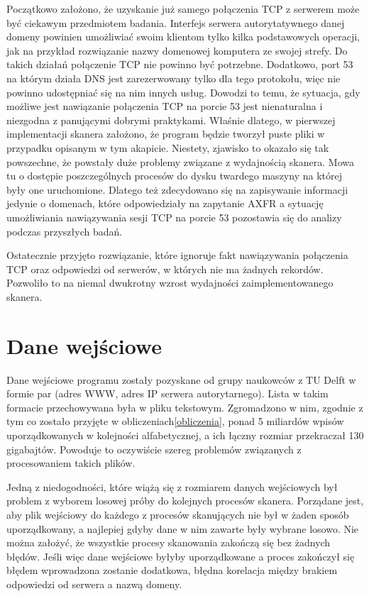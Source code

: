 Początkowo założono, że uzyskanie już samego połączenia TCP z serwerem może być ciekawym przedmiotem badania. Interfejs serwera autorytatywnego danej domeny powinien umożliwiać swoim klientom tylko kilka podstawowych operacji, jak na przykład rozwiązanie nazwy domenowej komputera ze swojej strefy. Do takich działań połączenie TCP nie powinno być potrzebne. Dodatkowo, port 53 na którym działa DNS jest zarezerwowany tylko dla tego protokołu, więc nie powinno udostępniać się na nim innych usług. Dowodzi to temu, że sytuacja, gdy możliwe jest nawiązanie połączenia TCP na porcie 53 jest nienaturalna i niezgodna z panującymi dobrymi praktykami. Właśnie dlatego, w pierwszej implementacji skanera założono, że program będzie tworzył puste pliki w przypadku opisanym w tym akapicie. Niestety, zjawisko to okazało się tak powszechne, że powstały duże problemy związane z wydajnością skanera. Mowa tu o dostępie poszczególnych procesów do dysku twardego maszyny na której były one uruchomione. Dlatego też zdecydowano się na zapisywanie informacji jedynie o domenach, które odpowiedziały na zapytanie AXFR a sytuację umożliwiania nawiązywania sesji TCP na porcie 53 pozostawia się do analizy podczas przyszłych badań.

Ostatecznie przyjęto rozwiązanie, które ignoruje fakt nawiązywania połączenia TCP oraz odpowiedzi od serwerów, w których nie ma żadnych rekordów. Pozwoliło to na niemal dwukrotny wzrost wydajności zaimplementowanego skanera.

\section{Dane wejściowe}
Dane wejściowe programu zostały pozyskane od grupy naukowców z TU Delft\cite{delft} w formie par (adres WWW, adres IP serwera autorytarnego). Lista w takim formacie przechowywana była w pliku tekstowym. Zgromadzono w nim, zgodnie z tym co zostało przyjęte w obliczeniach\ref{obliczenia}, ponad 5 miliardów wpisów uporządkowanych w kolejności alfabetycznej, a ich łączny rozmiar przekraczał 130 gigabajtów. Powoduje to oczywiście szereg problemów związanych z procesowaniem takich plików. 

Jedną z niedogodności, które wiążą się z rozmiarem danych wejściowych był problem z wyborem losowej próby do kolejnych procesów skanera. Porządane jest, aby plik wejściowy do każdego z procesów skanujących nie był w żaden sposób uporządkowany, a najlepiej gdyby dane w nim zawarte były wybrane losowo. Nie można założyć, że wszystkie procesy skanowania zakończą się bez żadnych błędów. Jeśli więc dane wejściowe byłyby uporządkowane a proces zakończył się błędem wprowadzona zostanie dodatkowa, błędna korelacja między brakiem odpowiedzi od serwera a nazwą domeny.

